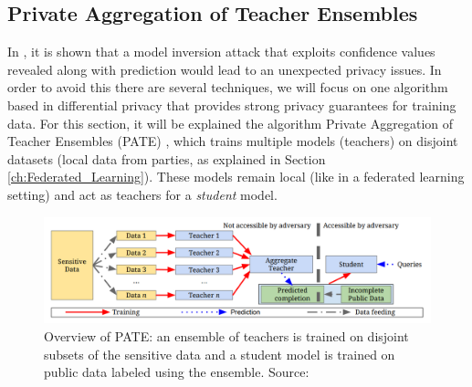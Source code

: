 \subsection{Private Aggregation of Teacher Ensembles}
In \cite{fredrikson2015}, it is shown that a model inversion attack that exploits confidence values revealed along with prediction would lead to an unexpected privacy issues. In order to avoid this there are several techniques, we will focus on one algorithm based in differential privacy that provides strong privacy guarantees for training data.
For this section, it will be explained the algorithm Private Aggregation of Teacher Ensembles (PATE) \cite{papernot2017}, which trains multiple models (teachers) on disjoint datasets (local data from parties, as explained in Section \ref{ch:Federated_Learning}). These models remain local (like in a federated learning setting) and act as teachers for a \textit{student} model.

\begin{figure}[H]
    \centering
    \includegraphics[scale=.35]{figures/4-Advanced_Strategies/PATE_scheme.png}
    \caption{Overview of PATE: an ensemble of teachers is trained on disjoint subsets of the sensitive data and a student model is trained on public data labeled using the ensemble. Source: \cite*{papernot2017}}
\end{figure}

